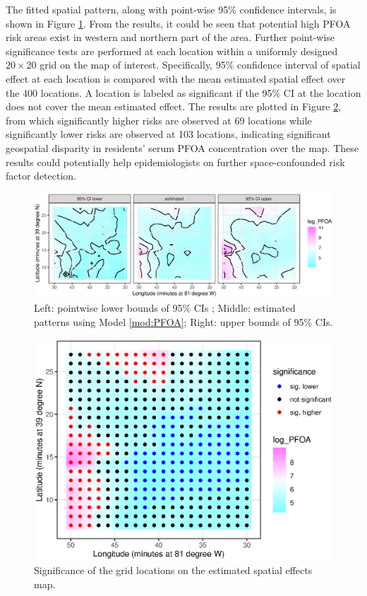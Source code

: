 	The fitted spatial pattern, along with point-wise 95\% confidence intervals, is shown in Figure \ref{f:pfoaplots}. From the results, it could be seen that potential high PFOA risk areas exist in western and northern part of the area. Further point-wise significance tests are performed at each location within a uniformly designed $20\times 20$ grid on the map of interest. Specifically, 95\% confidence interval of spatial effect at each location is compared with the mean estimated spatial effect over the 400 locations. A location is labeled as significant if the 95\% CI at the location does not cover the mean estimated effect. The results are plotted in Figure \ref{f:pfoasigs}, from which significantly higher risks are observed at 69 locations while significantly lower risks are observed at 103 locations, indicating significant geospatial disparity in residents' serum PFOA concentration over the map. These results could potentially help epidemiologists on further space-confounded risk factor detection. 
	
	\begin{figure}[H]
		\begin{center}
			\includegraphics[width=\linewidth]{Figures/Chap4/PFOA_ests_55.eps}
		\end{center}
		\caption{Left: pointwise lower bounds of 95\% CIs ; Middle: estimated patterns using Model \ref{mod:PFOA}; Right: upper bounds of 95\% CIs.}
		\label{f:pfoaplots}
	\end{figure}

	\begin{figure}[H]
		\begin{center}
			\includegraphics[width=0.5\linewidth]{Figures/Chap4/PFOA_sig.eps}
		\end{center}
		\caption{Significance of the grid locations on the estimated spatial effects map.}
		\label{f:pfoasigs}
	\end{figure}
	
